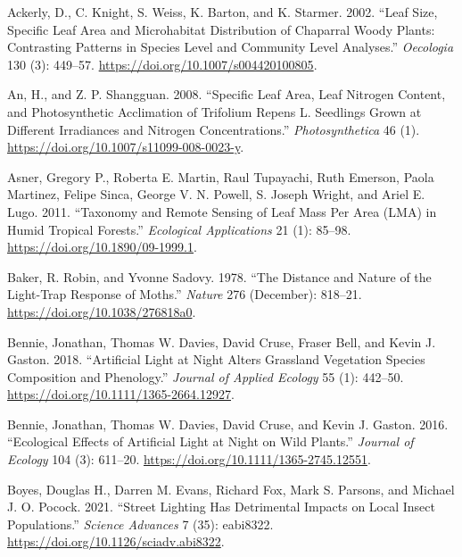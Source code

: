 \documentclass[
]{article}
\newlength{\cslhangindent}
\newlength{\cslentryspacingunit} %
\newenvironment{CSLReferences}[2] %
 {%
  \setlength{\parindent}{0pt}
  \ifodd #1
  \let\oldpar\par
  \def\par{\hangindent=\cslhangindent\oldpar}
  \fi
  \setlength{\parskip}{#2\cslentryspacingunit}
 }%
 {}
\begin{document}
\hypertarget{refs}{}
\begin{CSLReferences}{1}{0}
\leavevmode{}%
Ackerly, D., C. Knight, S. Weiss, K. Barton, and K. Starmer. 2002.
{``Leaf Size, Specific Leaf Area and Microhabitat Distribution of
Chaparral Woody Plants: Contrasting Patterns in Species Level and
Community Level Analyses.''} \emph{Oecologia} 130 (3): 449--57.
\url{https://doi.org/10.1007/s004420100805}.

\leavevmode{}%
An, H., and Z. P. Shangguan. 2008. {``Specific Leaf Area, Leaf Nitrogen
Content, and Photosynthetic Acclimation of {Trifolium} Repens {L}.
Seedlings Grown at Different Irradiances and Nitrogen Concentrations.''}
\emph{Photosynthetica} 46 (1).
\url{https://doi.org/10.1007/s11099-008-0023-y}.

\leavevmode{}%
Asner, Gregory P., Roberta E. Martin, Raul Tupayachi, Ruth Emerson,
Paola Martinez, Felipe Sinca, George V. N. Powell, S. Joseph Wright, and
Ariel E. Lugo. 2011. {``Taxonomy and Remote Sensing of Leaf Mass Per
Area ({LMA}) in Humid Tropical Forests.''} \emph{Ecological
Applications} 21 (1): 85--98. \url{https://doi.org/10.1890/09-1999.1}.

\leavevmode{}%
Baker, R. Robin, and Yvonne Sadovy. 1978. {``The Distance and Nature of
the Light-Trap Response of Moths.''} \emph{Nature} 276 (December):
818--21. \url{https://doi.org/10.1038/276818a0}.

\leavevmode{}%
Bennie, Jonathan, Thomas W. Davies, David Cruse, Fraser Bell, and Kevin
J. Gaston. 2018. {``Artificial Light at Night Alters Grassland
Vegetation Species Composition and Phenology.''} \emph{Journal of
Applied Ecology} 55 (1): 442--50.
\url{https://doi.org/10.1111/1365-2664.12927}.

\leavevmode{}%
Bennie, Jonathan, Thomas W. Davies, David Cruse, and Kevin J. Gaston.
2016. {``Ecological Effects of Artificial Light at Night on Wild
Plants.''} \emph{Journal of Ecology} 104 (3): 611--20.
\url{https://doi.org/10.1111/1365-2745.12551}.

\leavevmode{}%
Boyes, Douglas H., Darren M. Evans, Richard Fox, Mark S. Parsons, and
Michael J. O. Pocock. 2021. {``Street Lighting Has Detrimental Impacts
on Local Insect Populations.''} \emph{Science Advances} 7 (35):
eabi8322. \url{https://doi.org/10.1126/sciadv.abi8322}.


\end{CSLReferences}
\end{document}

